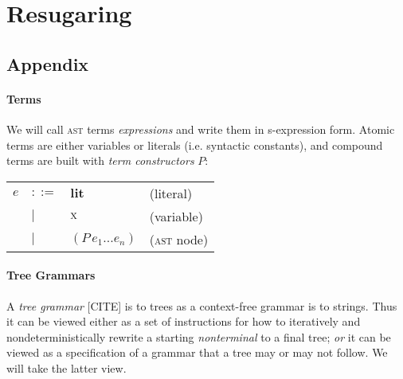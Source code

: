 \documentclass[
  10pt,
  paper=letter,
  footinclude=true,
  headinclude=true,
  american
]{scrbook}
\makeatletter
\newenvironment{Table}
  {\begin{center}\begin{tabular}{l l l @{\quad}l}}
  {\end{tabular}\end{center}}
\renewcommand{\<}{\le}
\makeatother
\begin{document}
\part{Resugaring}
%

%





\chapter{Appendix}


\newcommand{\lit}[1]{\textbf{#1}}
\newcommand{\expr}[2]{(#1\,#2)}
\newcommand{\var}[1]{\textrm{\textsc{#1}}}

\newcommand{\exprs}[3]{(#1\,#2\,#3^{*})}
\newcommand{\production}[2]{#1 \leftarrow #2}
\newcommand{\saysG}[3]{#1 \vdash #2\,:\,#3}

\newcommand{\SaysScopeCheck}[6]{#1 \vdash #2 : #3 ; #4 ; #5 ; #6}


\subsection{Terms}

We will call \textsc{ast} terms \emph{expressions} and write them in
s-expression form. Atomic terms are either variables or literals
(i.e. syntactic constants), and compound terms are built with
\emph{term constructors} $P$:

\begin{Table}
  $e$
  &$::=$& $\lit{lit}$ &(literal) \\
  &$|$&   $\var{x}$ &(variable) \\
  &$|$&   $\expr{P}{e_1 ... e_n}$ &(\textsc{ast} node)
\end{Table}

\subsection{Tree Grammars}

A \emph{tree grammar} [CITE] is to trees as a context-free grammar is
to strings. Thus it can be viewed either as a set of instructions for
how to iteratively and nondeterministically rewrite a starting
\emph{nonterminal} to a final tree; \emph{or} it can be viewed as a
specification of a grammar that a tree may or may not follow. We will
take the latter view.
\end{document}
